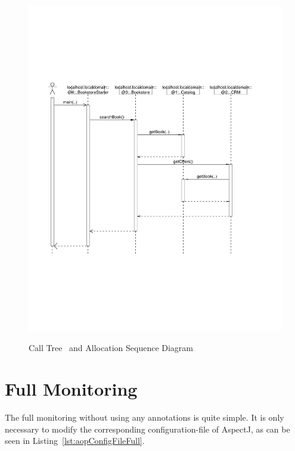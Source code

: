 \begin{figure}[H]
{	\includegraphics[height=0.4\textheight]{images/allocationSequenceDiagram}
	}%

	\caption{Call Tree~ and Allocation Sequence Diagram~}
\end{figure}


\section{Full Monitoring}\label{sec:aspectJ:fullweaving}
The full monitoring without using any annotations is quite simple. It is only necessary to modify the corresponding configuration-file of AspectJ, as can be seen in Listing~\ref{lst:aopConfigFileFull}.

